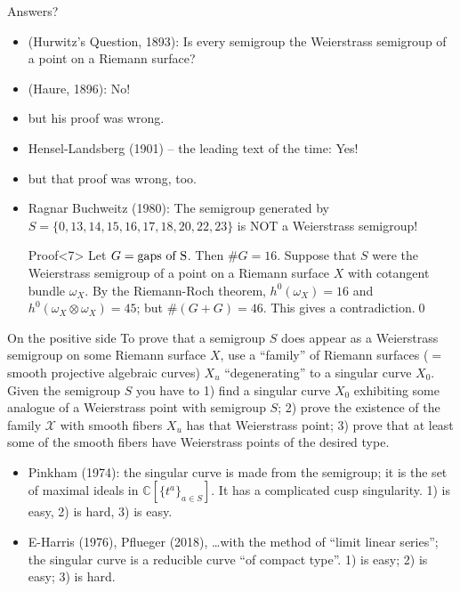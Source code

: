 \documentclass[11pt, aspectratio=43]{beamer}
\def\C{{\mathbb C}}
\begin{document}
\begin{frame}{Answers?}
 
\begin{itemize}
 \item<1-6> (Hurwitz's Question, 1893):\alert{ Is every semigroup the Weierstrass semigroup of a point
on a Riemann surface?}
\item <2-> \qquad (Haure, 1896): No!
\item<3-> \qquad\qquad but his proof was wrong.
\item<4-> \qquad Hensel-Landsberg (1901) -- the leading text of the time: Yes!
\item<5-> \qquad\qquad but that proof was wrong, too.
\item<6-> \qquad \alert{Ragnar Buchweitz} (1980): The semigroup generated by
$S = \{0, 13, 14, 15, 16, 17, 18, 20, 22, 23\} $ is NOT a Weierstrass semigroup! 
\smallskip

\begin{block}{Proof}<7>
 Let $G= \hbox{gaps of S}$. Then $\#G = 16$. Suppose that $S$ were the Weierstrass semigroup
of a point on a Riemann surface $X$ with cotangent bundle $\omega_X$. By the Riemann-Roch theorem,
$h^0(\omega_X) = 16$ and $h^0(\omega_X\otimes \omega_X) = 45$; but $\#(G+G) = 46$. This gives a  contradiction.\qed
\end{block}

\end{itemize}
\end{frame}

\begin{frame}{On the positive side}
To prove that a semigroup $S$ does appear as a Weierstrass semigroup on some
Riemann surface $X$, use a ``family'' of
Riemann surfaces  ($=$ smooth projective algebraic curves) $X_u$ ``degenerating'' to a singular curve $X_0$.
 Given the semigroup $S$ you
have to 1) find a singular curve $X_0$ exhibiting some analogue of a Weierstrass point with semigroup $S$;
2) prove the existence of the family $\mathcal X$ with smooth fibers $X_u$ has that Weierstrass point;
3) prove that at least some of the smooth fibers have Weierstrass points of the desired type.

\begin{itemize}
 \item Pinkham (1974): the singular curve is made from the semigroup; it is the set 
of maximal ideals in $\C[\{t^a\}_{a\in S}]$. It has a complicated cusp singularity. 1) is easy, 2) is hard, 3) is easy.

\item E-Harris (1976), Pflueger (2018), \dots with the method of ``limit linear series''; the singular curve is a reducible curve ``of compact type''. 1) is easy; 2) is easy; 3) is hard.
\end{itemize}
\end{frame}
\end{document}
